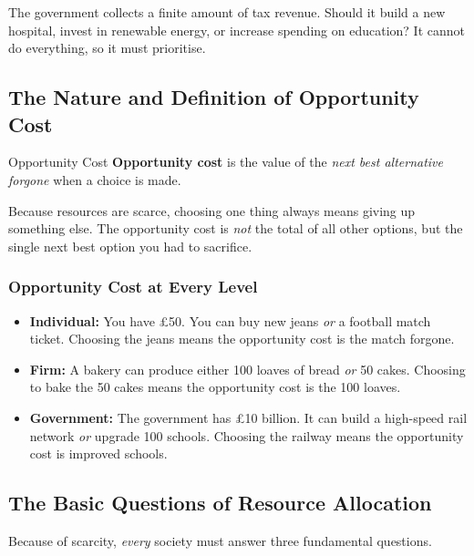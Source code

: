 \documentclass[11pt, a4paper, twoside]{book}
\begin{document}
\begin{example}[Governments]
The government collects a finite amount of tax revenue. Should it build a new hospital, invest in renewable energy, or increase spending on education? It cannot do everything, so it must prioritise.
\end{example}

\subsection{The Nature and Definition of Opportunity Cost}

\begin{keyterm}{Opportunity Cost}
\textbf{Opportunity cost} is the value of the \emph{next best alternative forgone} when a choice is made.

Because resources are scarce, choosing one thing always means giving up something else. The opportunity cost is \emph{not} the total of all other options, but the single next best option you had to sacrifice.
\end{keyterm}

\subsubsection{Opportunity Cost at Every Level}

\begin{itemize}
  \item \textbf{Individual:} You have £50. You can buy new jeans \emph{or} a football match ticket. Choosing the jeans means the opportunity cost is the match forgone.
  \item \textbf{Firm:} A bakery can produce either 100 loaves of bread \emph{or} 50 cakes. Choosing to bake the 50 cakes means the opportunity cost is the 100 loaves.
  \item \textbf{Government:} The government has £10 billion. It can build a high-speed rail network \emph{or} upgrade 100 schools. Choosing the railway means the opportunity cost is improved schools.
\end{itemize}

\subsection{The Basic Questions of Resource Allocation}

Because of scarcity, \emph{every} society must answer three fundamental questions.
\end{document}
